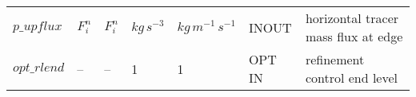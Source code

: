 \begin{landscape}
\begin{singlespacing}
\begin{longtable}{p{2.9cm}|x{2.9cm}|x{2.9cm}|x{1.9cm}|x{1.9cm}|x{1.7cm}|p{7.3cm}}
$p\_upflux$             &  $F^{n}_{i}$                  &  $F^{n}_{i}$              &  $kg\,s^{-3}$          &  $kg\,m^{-1}\,s^{-1}$  &  INOUT     &  horizontal tracer mass flux at edge \\
$opt\_rlend$            &  --                           &  --                       &  1                     &  1                     &  OPT IN    &  refinement control end level \\

\end{longtable}
\endgroup

\end{singlespacing}

\end{landscape}
\normalsize 
